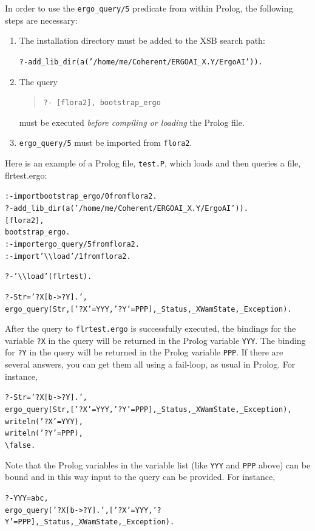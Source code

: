\documentclass[11pt]{article}
\newcommand{\ERGO}{\mbox{\smaller{\ensuremath{\cal{E}}\smaller{{\sc{RGO}}}}}\xspace}
\newcommand{\FLSYSTEM}{\ERGO}
\newcommand{\FLBOOTSTRAP}{bootstrap\_ergo}
\newcommand{\FLQUERYCMD}{ergo\_query}
\newcommand{\ergoext}{ergo\xspace}
\newcommand{\bs}{\textbackslash}
\begin{document}
In order to use the
\texttt{\FLQUERYCMD/5}
predicate from within Prolog,
the following steps are necessary:
\begin{enumerate}
  \item The \FLSYSTEM installation directory must be added to
    the XSB search path:
\begin{alltt}
 ?- add_lib_dir(a('/home/me/Coherent/ERGOAI_X.Y/ErgoAI')).  
\end{alltt}
  \item The query
    \begin{quote}
      {\tt ?- [flora2], \FLBOOTSTRAP} 
    \end{quote}
    must be executed \emph{before compiling or loading} the Prolog file.
  \item \texttt{\FLQUERYCMD/5}
    must be imported from {\tt flora2}.  
\end{enumerate}
Here is an example of a Prolog file, {\tt test.P}, which loads and then
queries a \FLSYSTEM file, flrtest.\ergoext:
\begin{alltt}
:- import \FLBOOTSTRAP/0 from flora2.
?- add_lib_dir(a('/home/me/Coherent/ERGOAI_X.Y/ErgoAI')).  
   [flora2],
   \FLBOOTSTRAP. 
:- import \FLQUERYCMD/5 from flora2.
:- import '\bs{}\bs{}load'/1 from flora2.

?- '\bs{}\bs{}load'(flrtest).  

?- Str='?X[b->?Y].',
   \FLQUERYCMD(Str,['?X'=YYY,'?Y'=PPP], _Status,_XWamState,_Exception).
\end{alltt}
After the query to {\tt flrtest.\ergoext} is successfully executed, the bindings
for the variable {\tt ?X} in the \FLSYSTEM query will be returned in the Prolog
variable {\tt YYY}. The binding  for {\tt ?Y} in the query will be returned in the
Prolog variable {\tt PPP}. If there are several answers, you can get them
all using a fail-loop, as usual in Prolog. For instance, 
\begin{alltt}
?- Str='?X[b->?Y].',
   \FLQUERYCMD(Str,['?X'=YYY,'?Y'=PPP], _Status,_XWamState,_Exception),
   writeln('?X' = YYY),
   writeln('?Y' = PPP),
   \bs{}false.
\end{alltt}
Note that the Prolog variables in the variable list (like {\tt YYY} and
{\tt PPP} above) can be bound and in this way input to the \FLSYSTEM query  
can be provided. For instance, 
\begin{alltt}
?- YYY=abc,
   \FLQUERYCMD('?X[b->?Y].',['?X'=YYY,'?Y'=PPP],_Status,_XWamState,_Exception).
\end{alltt}
\end{document}
